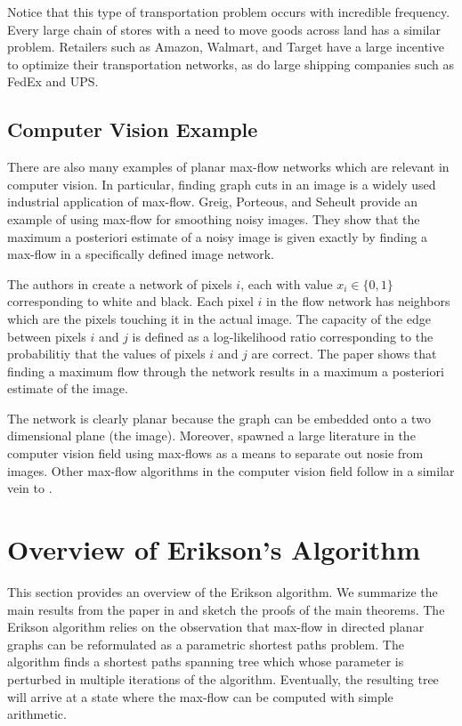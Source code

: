 \documentclass[12pt]{article}
\begin{document}
Notice that this type of transportation problem occurs with incredible frequency. Every large chain of stores with a need to move goods across land has a similar problem. Retailers such as Amazon, Walmart, and Target have a large incentive to optimize their transportation networks, as do large shipping companies such as FedEx and UPS. 

\subsection{Computer Vision Example}

There are also many examples of planar max-flow networks which are relevant in computer vision. In particular, finding graph cuts in an image is a widely used industrial application of max-flow. Greig, Porteous, and Seheult \cite{greigporteousseheult1989} provide an example of using max-flow for smoothing noisy images. They show that the maximum a posteriori estimate of a noisy image is given exactly by finding a max-flow in a specifically defined image network. 

The authors in \cite{greigporteousseheult1989} create a network of pixels $i$, each with value $x_i \in \{0,1\}$ corresponding to white and black. Each pixel $i$ in the flow network has neighbors which are the pixels touching it in the actual image. The capacity of the edge between pixels $i$ and $j$ is defined as a log-likelihood ratio corresponding to the probabilitiy that the values of pixels $i$ and $j$ are correct. The paper shows that finding a maximum flow through the network results in a maximum a posteriori estimate of the image. 

The network is clearly planar because the graph can be embedded onto a two dimensional plane (the image). Moreover, \cite{greigporteousseheult1989} spawned a large literature in the computer vision field using max-flows as a means to separate out nosie from images. Other max-flow algorithms in the computer vision field follow in a similar vein to \cite{greigporteousseheult1989}. 

\section{Overview of Erikson's Algorithm}

This section provides an overview of the Erikson algorithm. We summarize the main results from the paper in \cite{erikson2010} and sketch the proofs of the main theorems. The Erikson algorithm relies on the observation that max-flow in directed planar graphs can be reformulated as a parametric shortest paths problem. The algorithm finds a shortest paths spanning tree which whose parameter is perturbed in multiple iterations of the algorithm. Eventually, the resulting tree will arrive at a state where the max-flow can be computed with simple arithmetic. 
\end{document}
